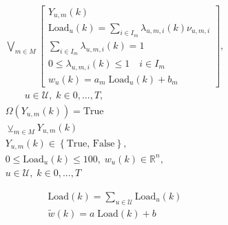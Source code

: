 \documentclass{tufte-handout}
\begin{document}
\begin{gather*}
\bigvee_{m \in M}
  \begin{bmatrix} 
    Y_{u,m} \left(k\right)\\
    \text{Load}_u \left(k\right) = \sum_{i \in I_m} \lambda_{u,m,i} \left(k \right) \nu_{u, m, i}
    \\ 
    \sum_{i \in I_m} \lambda_{u, m,i} \left(k \right) = 1 \\
    0 \leq \lambda_{u, m,i} \left(k \right) \leq 1 \quad i\in I_m \\
    w_u \left(k \right) = a_m \; \text{Load}_u \left(k \right) + b_m
  \end{bmatrix}, \\
 \qquad u \in \mathcal{U}, \; k \in {0,...,T}, \\
\Omega \left(Y_{u,m} \left( k\right) \right) = \text{True} \\
\veebar_{m \in M} Y_{u,m} \left(k\right) \\
Y_{u, m} \left(k \right) \in \left\{\text{True, False} \right\}, \\
0 \leq \text{Load}_u \left(k \right) \leq 100, \; w_u \left(k\right) \in \mathbb{R}^{n},\\
u \in \mathcal{U}, \; k \in {0,...,T}
\end{gather*}



\begin{gather*}
\text{Load}\left(k\right) = \sum_{u \in \mathcal{U}} \text{Load}_u\left(k\right) \\
\tilde{w} \left(k \right) = a \; \text{Load} \left(k \right) + b
\end{gather*}

\end{document}
